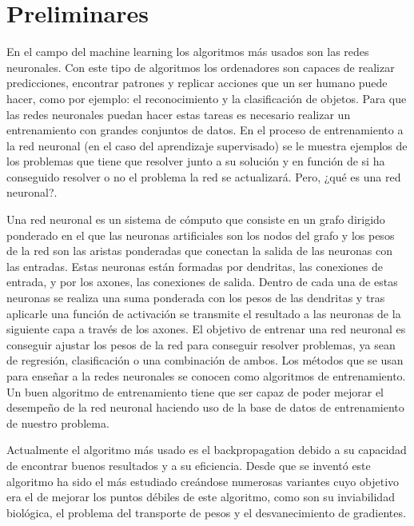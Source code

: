 \chapter{Preliminares} \label{preliminares}
En el campo del machine learning los algoritmos más usados son las redes neuronales. Con este tipo de algoritmos los ordenadores son capaces de realizar predicciones, encontrar patrones y replicar acciones que un ser humano puede hacer, como por ejemplo: el reconocimiento y la clasificación de objetos. Para que las redes neuronales puedan hacer estas tareas es necesario realizar un entrenamiento con grandes conjuntos de datos. En el proceso de entrenamiento a la red neuronal (en el caso del aprendizaje supervisado) se le muestra ejemplos de los problemas que tiene que resolver junto a su solución y en función de si ha conseguido resolver o no el problema la red se actualizará. Pero, ¿qué es una red neuronal?.

Una red neuronal \cite{RefWorks:RefID:22-jain1996artificial} es un sistema de cómputo que consiste en un grafo dirigido ponderado en el que las neuronas artificiales son los nodos del grafo y los pesos de la red son las  aristas ponderadas que conectan la salida de las neuronas con las entradas. Estas neuronas están formadas por dendritas, las conexiones de entrada, y por los axones, las conexiones de salida. Dentro de cada una de estas neuronas se realiza una suma ponderada con los pesos de las dendritas y tras aplicarle una función de activación se transmite el resultado a las neuronas de la siguiente capa a través de los axones. El objetivo de entrenar una red neuronal es conseguir ajustar los pesos de la red para conseguir resolver problemas, ya sean de regresión, clasificación o una combinación de ambos. Los métodos que se usan para enseñar a la redes neuronales se conocen como algoritmos de entrenamiento. Un buen algoritmo de entrenamiento tiene que ser capaz de poder mejorar el desempeño de la red neuronal haciendo uso de la base de datos de entrenamiento de nuestro problema.

Actualmente el algoritmo más usado es el backpropagation \cite{RefWorks:RefID:6-rumelhart1986learning} debido a su capacidad de encontrar buenos resultados y a su eficiencia. Desde que se inventó este algoritmo ha sido el más estudiado creándose numerosas variantes cuyo objetivo era el de mejorar los puntos débiles de este algoritmo, como son su inviabilidad biológica, el problema del transporte de pesos \cite{RefWorks:RefID:10-grossberg1987competitive} y el desvanecimiento de gradientes.

